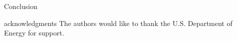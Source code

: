 \documentclass[serif]{beamer}
\begin{document}
\begin{frame}{}
\begin{columns}[t]
\begin{column}{0.32\paperwidth}
\begin{block}{Conclusion}
\end{block}
\begin{block}{acknowledgments}
The authors would like to thank the U.S. Department of Energy for support.
\end{block}
\end{column}
\end{columns}
\end{frame}
\end{document}

